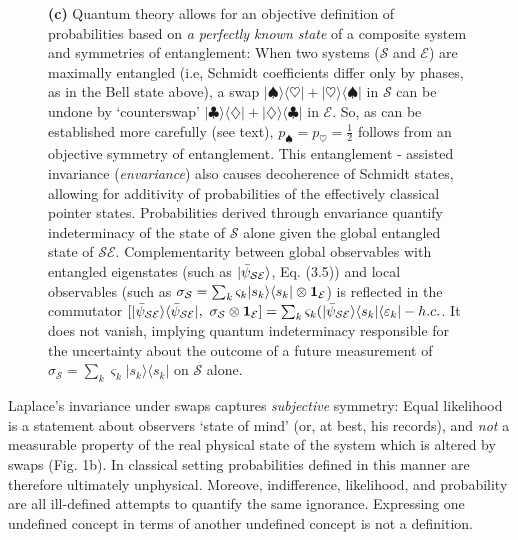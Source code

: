 \documentclass[aps,twocolumn,rmp,epsfig]{revtex4}
\newcommand{\bra}[1]    {\langle #1|}
\newcommand{\ket}[1]    {| #1 \rangle}
\newcommand{\cS}        {{\mathcal S}}
\newcommand{\cE}        {{\mathcal E}}
\newcommand{\+}         {\dagger}
\begin{document}
\begin{figure}[tb]
{{\bf (c)} Quantum theory allows for an objective definition of probabilities based on {\it a perfectly known state} of a composite system and symmetries of entanglement: When two systems ($\cS$ and $\cE$) 
are maximally entangled (i.e, Schmidt coefficients differ only by phases, as in the Bell state
above), a swap $\ket \spadesuit \bra \heartsuit + \ket \heartsuit \bra \spadesuit$ in $\cS$ can be undone by `counterswap' $\ket \clubsuit \bra \diamondsuit + \ket \diamondsuit \bra \clubsuit$ in $\cE$. So, 
as can be established more carefully (see text),  $p_\spadesuit = p_\heartsuit=\frac 1 2$ follows from 
an objective symmetry of entanglement. This entanglement - assisted invariance ({\it envariance}) 
also causes decoherence of Schmidt states, allowing for additivity of probabilities of the effectively classical pointer states. Probabilities derived through envariance quantify indeterminacy of the state of 
$\cS$ alone given the global entangled state of $\cS\cE$. Complementarity between 
global observables with entangled eigenstates (such as $\ket {\bar \psi_{\cal SE}}$, Eq. (3.5)) and 
local observables (such as $\sigma_{\cS} = \sum_k \varsigma_k |s_k \rangle \langle s_k|\otimes {\bf 1}_{\cE}$) is reflected in the commutator $[\ket {\bar \psi_{\cal SE}}\bra {\bar \psi_{\cal SE}}, ~\sigma_{\cS} \otimes {\bf 1}_{\cE}]=\sum_k \varsigma_k (\ket {\bar \psi_{\cal SE}}\bra {s_k } \bra {\varepsilon_k} - h.c.$. 
It does not vanish, implying quantum indeterminacy responsible for the uncertainty about the outcome 
of a future measurement of $\sigma_{\cS} = \sum_k \varsigma_k |s_k\rangle \langle s_k|$ on $\cS$ alone.}
\label{cards}
\end{figure}

Laplace's invariance under swaps captures {\it subjective} symmetry: Equal likelihood is a statement 
about observers `state of mind'  (or, at best, his records), and {\it not} a measurable property of the real 
physical state of the system which is altered by swaps (Fig. 1b). In classical setting probabilities defined 
in this manner are therefore ultimately unphysical. Moreove, indifference, likelihood, and probability are all ill-defined attempts to quantify the same ignorance. Expressing one undefined concept in terms of another undefined concept is not a definition.
\end{document}

